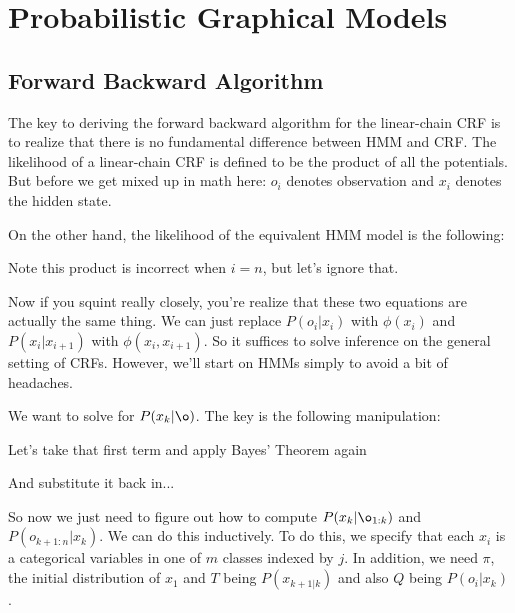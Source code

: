 \documentclass[12pt]{article}
\begin{document}
\section{Probabilistic Graphical Models}
\subsection{Forward Backward Algorithm}

The key to deriving the forward backward algorithm for the linear-chain CRF is to realize that there is no fundamental difference between HMM and CRF.
The likelihood of a linear-chain CRF is defined to be the product of all the potentials. But before we get mixed up in math here: $o_i$ denotes observation and $x_i$ denotes the hidden state.


On the other hand, the likelihood of the equivalent HMM model is the following:

Note this product is incorrect when $i = n$, but let's ignore that.

Now if you squint really closely, you're realize that these two equations are actually the same thing. We can just replace $P(o_i|x_i)$ with $\phi(x_i)$ and $P(x_i|x_{i+1})$ with $\phi(x_i, x_{i+1})$. So it suffices to solve inference on the general setting of CRFs. However, we'll start on HMMs simply to avoid a bit of headaches.

We want to solve for $P(x_k|\o)$. The key is the following manipulation:


Let's take that first term and apply Bayes' Theorem again


And substitute it back in...


So now we just need to figure out how to compute $P(x_k|\o_{1:k})$ and $P(o_{k+1:n}|x_k)$. We can do this inductively. To do this, we specify that each $x_i$ is a categorical variables in one of $m$ classes indexed by $j$. In addition, we need $\pi$, the initial distribution of $x_1$ and $T$ being $P(x_{k+1|k})$ and also $Q$ being $P(o_i|x_k)$. 
\end{document}
